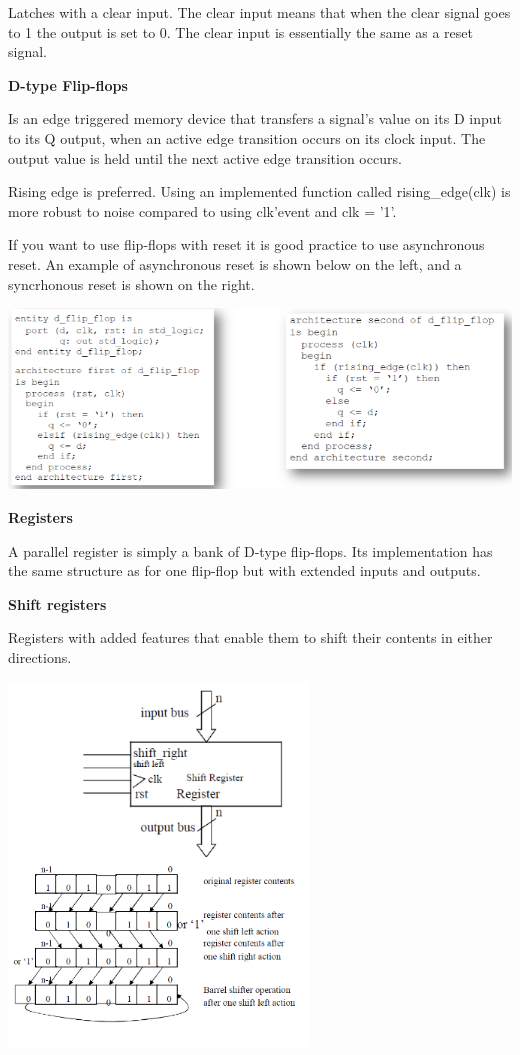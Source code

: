 Latches with a clear input. The clear input means that when the clear signal
goes to 1 the output is set to 0.
The clear input is essentially the same as a reset signal.


\textbf{D-type Flip-flops}

Is an edge triggered memory device that transfers a signal's value on its
D input to its Q output, when an active edge transition occurs on its clock input.
The output value is held until the next active edge transition occurs.

Rising edge is preferred. Using an implemented function called rising\_edge(clk)
is more robust to noise compared to using clk'event and clk = '1'.

If you want to use flip-flops with reset it is good practice to use asynchronous reset.
An example of asynchronous reset is shown below on the left, and a syncrhonous reset is shown on the right.

\begin{center}
	\includegraphics[width=\textwidth]{images/ff_reset.png}
\end{center}



\textbf{Registers}

A parallel register is simply a bank of D-type flip-flops. Its implementation
has the same structure as for one flip-flop but with extended inputs and outputs.


\textbf{Shift registers}

Registers with added features that enable them to shift their contents in either directions.

\begin{center}
	\includegraphics[width=0.6\textwidth]{images/shiftRegister.png}
\end{center}


